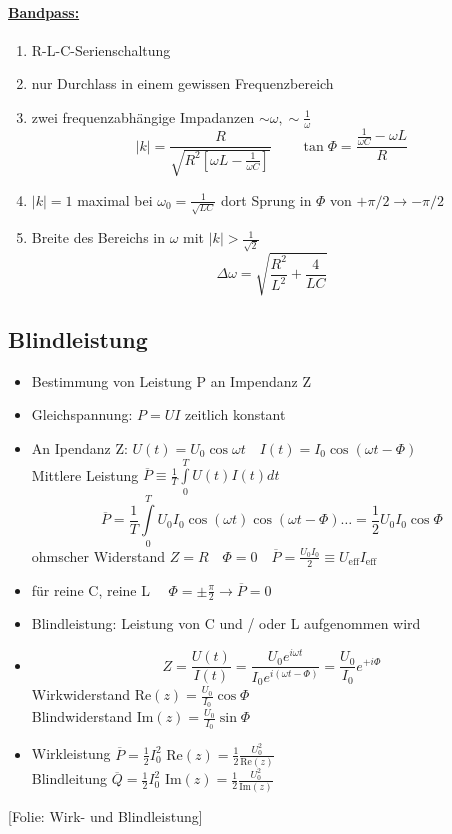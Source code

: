 \documentclass[titlepage,12pt,a4paper,ngerman]{report}
\newcommand{\tx}[1]{\textrm{#1}}
\newcommand{\folie}[1]{\color{gray}[Folie: #1]\color{black}}
\begin{document}
\paragraph{\underline{Bandpass:}}
\begin{enumerate}
	\item R-L-C-Serienschaltung
	\item nur Durchlass in einem gewissen Frequenzbereich
	\item zwei frequenzabhängige Impadanzen $ \sim \omega, \sim \frac{1}{\omega} $\\
	$$|k| = \frac{R}{\sqrt{R^2 [\omega L - \frac{1}{\omega C}]}} \qquad \tan \Phi = \frac{\frac{1}{\omega C} - \omega L}{R} $$
	\item $ |k| = 1 $ maximal bei $ \omega_0 = \frac{1}{\sqrt{LC}} $ dort Sprung in $ \Phi $ von $ + \pi/2 \rightarrow - \pi/2 $
	\item Breite des Bereichs in $ \omega $ mit $ |k| > \frac{1}{\sqrt{2}} $\\
	$$ \Delta \omega = \sqrt{\frac{R^2}{L^2} + \frac{4}{LC}} $$
\end{enumerate}
\subsection{Blindleistung}
\begin{itemize}
	\item Bestimmung von Leistung P an Impendanz Z 
	\item Gleichspannung: $ P = U I $ zeitlich konstant
	\item An Ipendanz Z: $ U(t) = U_0 \cos \omega t \quad I(t) = I_0 \cos (\omega t-\Phi) $\\
	Mittlere Leistung $ \overline{P} \equiv \frac{1}{T} \int\limits_{0}^{T} U(t) I(t) dt $\\
	$$ \overline{P} = \frac{1}{T} \int\limits_{0}^{T} U_0 I_0 \cos (\omega t) \cos (\omega t - \Phi) \dots = \frac{1}{2} U_0 I_0 \cos \Phi $$
	ohmscher Widerstand $ Z = R \quad \Phi = 0 \quad \overline{P} = \frac{U_0 I_0}{2} \equiv U_{\tx{eff}} I_{\tx{eff}} $
	\item für reine C, reine L $ \quad \Phi = \pm \frac{\pi}{2} \rightarrow \overline{P} = 0 $
	\item  Blindleistung: Leistung von C und / oder L aufgenommen wird
	
	
	\item $$Z = \frac{U(t)}{I(t)} = \frac{U_0 e^{i\omega t}}{I_0 e ^{i(\omega t - \Phi)}} = \frac{U_0}{I_0} e ^{+i\Phi}$$
	Wirkwiderstand $ \tx{Re} (z) = \frac{U_0}{I_0} \cos \Phi $\\
	Blindwiderstand $ \tx{Im} (z) = \frac{U_0}{I_0} \sin \Phi $
	\item Wirkleistung $ \overline{P} = \frac{1}{2} I_0^2 \tx{ Re}(z) = \frac{1}{2} \frac{U_0^2}{\tx{Re}(z)} $\\
	Blindleitung $ \overline{Q} = \frac{1}{2} I_0^2 \tx{ Im}(z) = \frac{1}{2} \frac{U_0^2}{\tx{Im}(z)} $
\end{itemize}
\folie{Wirk- und Blindleistung}
\end{document}
